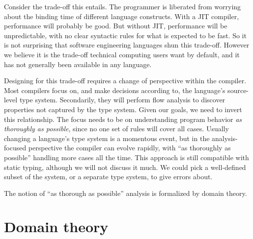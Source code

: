 Consider the trade-off this entails.
The programmer is liberated from worrying about the binding time of
different language constructs.
With a JIT compiler, performance will probably be good.
But without JIT, performance will be unpredictable, with no clear
syntactic rules for what is expected to be fast.
So it is not surprising that software engineering languages shun this
trade-off.
However we believe it is the trade-off technical computing
users want by default, and it has not generally been available
in any language.

Designing for this trade-off requires a change of perspective
within the compiler.
Most compilers focus on, and make decisions according to, the
language's source-level type system.
Secondarily, they will perform flow analysis to discover
properties not captured by the type system.
Given our goals, we need to invert this relationship.
The focus needs to be on understanding program behavior
\emph{as thoroughly as possible}, since no one set of rules
will cover all cases.
Usually changing a language's type system is a momentous event,
but in the analysis-focused perspective the compiler can evolve
rapidly, with ``as thoroughly as possible'' handling more cases
all the time.
This approach is still compatible with static typing, although we will not
discuss it much.
We could pick a well-defined subset of the system,
or a separate type system, to give errors about.

The notion of ``as thorough as possible'' analysis is formalized
by domain theory.




\section{Domain theory}

